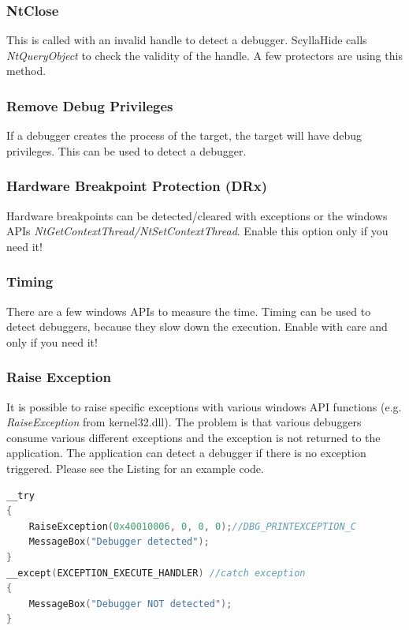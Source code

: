 \documentclass[10pt,a4paper]{article}
\begin{document}
\subsubsection{NtClose}
This is called with an invalid handle to detect a debugger. ScyllaHide calls \textit{NtQueryObject} to check the validity of the handle. A few protectors are using this method.

\subsubsection{Remove Debug Privileges}
If a debugger creates the process of the target, the target will have debug privileges. This can be used to detect a debugger.

\subsubsection{Hardware Breakpoint Protection (DRx)}
Hardware breakpoints can be detected/cleared with exceptions or the windows APIs \textit{NtGetContextThread/NtSetContextThread}. Enable this option only if you need it!

\subsubsection{Timing}
There are a few windows APIs to measure the time. Timing can be used to detect debuggers, because they slow down the execution. Enable with care and only if you need it!

\subsubsection{Raise Exception}
\label{sec:RaiseException_section}
It is possible to raise specific exceptions with various windows API functions (e.g. \textit{RaiseException} from kernel32.dll). The problem is that various debuggers consume various different exceptions and the exception is not returned to the application. The application can detect a debugger if there is no exception triggered. Please see the Listing for an example code.

\begin{lstlisting}[language=C, caption=Raise Exception Example]
__try
{
    RaiseException(0x40010006, 0, 0, 0);//DBG_PRINTEXCEPTION_C
    MessageBox("Debugger detected");
}
__except(EXCEPTION_EXECUTE_HANDLER) //catch exception
{
    MessageBox("Debugger NOT detected");
}
\end{lstlisting}
\end{document}

